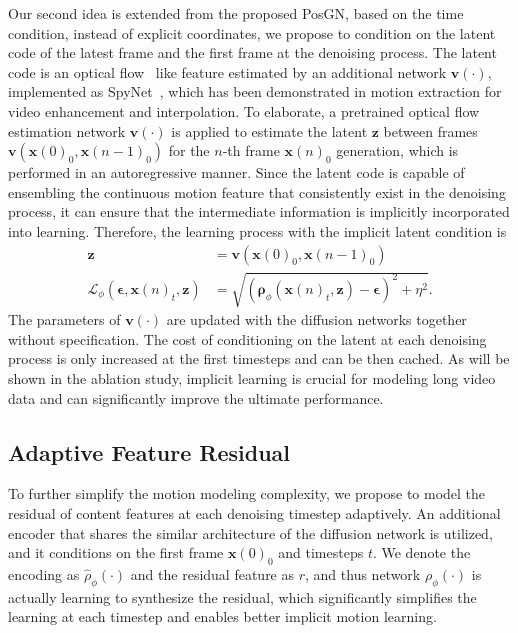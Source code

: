 \documentclass[letterpaper]{article}
\newcommand{\bx}{\mathbf{x}}
\newcommand{\bz}{\mathbf{z}}
\newcommand{\bepsilon}{{\boldsymbol{\epsilon}}}
\newcommand{\brho}{{\boldsymbol{\rho}}}
\begin{document}
Our second idea is extended from the proposed PosGN, based on the time condition, instead of explicit coordinates, we propose to condition on the latent code of the latest frame and the first frame at the denoising process.
The latent code is an optical flow~\cite{horn1981determining} like feature estimated by an additional network $\mathbf{v}(\cdot)$, implemented as SpyNet~\cite{ranjan2017optical}, which has been demonstrated in motion extraction for video enhancement and interpolation.
To elaborate, a pretrained optical flow estimation network $\mathbf{v}(\cdot)$ is applied to estimate the latent $\mathbf{z}$ between frames $\mathbf{v}(\bx(0)_0, \bx(n-1)_0)$ for the $n$-th frame $\bx(n)_0$ generation, which is performed in an autoregressive manner.
Since the latent code is capable of ensembling the continuous motion feature that consistently exist in the denoising process, it can ensure that the intermediate information is implicitly incorporated into learning.
Therefore, the learning process with the implicit latent condition is 
\begin{align}
  \bz &= \mathbf{v}(\bx(0)_0, \bx(n-1)_0)\\
  \mathcal{L}_\phi(\bepsilon, \bx(n)_t, \bz) &= \sqrt{(\brho_{\phi}(\bx(n)_t, \bz) - \bepsilon)^2 + \eta^2}.
\end{align}
The parameters of $\mathbf{v}(\cdot)$ are updated with the diffusion networks together without specification.
The cost of conditioning on the latent at each denoising process is only increased at the first timesteps and can be then cached.
As will be shown in the ablation study, implicit learning is crucial for modeling long video data and can significantly improve the ultimate performance.

\subsection{Adaptive Feature Residual}
To further simplify the motion modeling complexity, we propose to model the residual of content features at each denoising timestep adaptively.
An additional encoder that shares the similar architecture of the diffusion network is utilized, and it conditions on the first frame $\bx(0)_0$ and timesteps $t$.
We denote the encoding as $\hat\rho_\phi(\cdot)$ and the residual feature as $r$, and thus network $\rho_\phi(\cdot)$ is actually learning to synthesize the residual, which significantly simplifies the learning at each timestep and enables better implicit motion learning.
\end{document}
